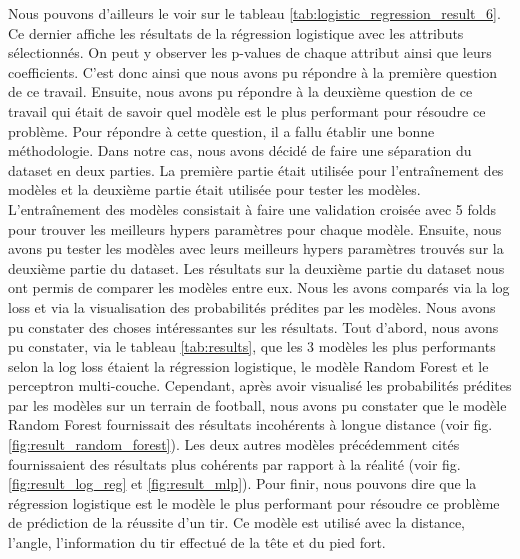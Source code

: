 \documentclass[12pt]{article}
\begin{document}
Nous pouvons d'ailleurs le voir sur le tableau \ref{tab:logistic_regression_result_6}.
Ce dernier affiche les résultats de la régression logistique avec les attributs sélectionnés. 
On peut y observer les p-values de chaque attribut ainsi que leurs coefficients.
C'est donc ainsi que nous avons pu répondre à la première question de ce travail.
\newline\newline
Ensuite, nous avons pu répondre à la deuxième question de ce travail qui était de savoir quel modèle est le plus performant pour résoudre ce problème.
Pour répondre à cette question, il a fallu établir une bonne méthodologie.
\newline\newline
Dans notre cas, nous avons décidé de faire une séparation du dataset en deux parties.
La première partie était utilisée pour l'entraînement des modèles et la deuxième partie était utilisée pour tester les modèles.
L'entraînement des modèles consistait à faire une validation croisée avec 5 folds pour trouver les meilleurs hypers paramètres pour chaque modèle.
Ensuite, nous avons pu tester les modèles avec leurs meilleurs hypers paramètres trouvés sur la deuxième partie du dataset.
\newline\newline
Les résultats sur la deuxième partie du dataset nous ont permis de comparer les modèles entre eux.
Nous les avons comparés via la log loss et via la visualisation des probabilités prédites par les modèles.
Nous avons pu constater des choses intéressantes sur les résultats.
Tout d'abord, nous avons pu constater, via le tableau \ref{tab:results}, que les 3 modèles les plus performants selon la log loss étaient la régression logistique, le modèle Random Forest et le perceptron multi-couche.
Cependant, après avoir visualisé les probabilités prédites par les modèles sur un terrain de football, nous avons pu constater que le modèle Random Forest fournissait des résultats incohérents à longue distance (voir fig. \ref{fig:result_random_forest}).
Les deux autres modèles précédemment cités fournissaient des résultats plus cohérents par rapport à la réalité (voir fig. \ref{fig:result_log_reg} et \ref{fig:result_mlp}).
\newline\newline
Pour finir, nous pouvons dire que la régression logistique est le modèle le plus performant pour résoudre ce problème de prédiction de la réussite d'un tir.
Ce modèle est utilisé avec la distance, l'angle, l'information du tir effectué de la tête et du pied fort.
\newpage
\end{document}

